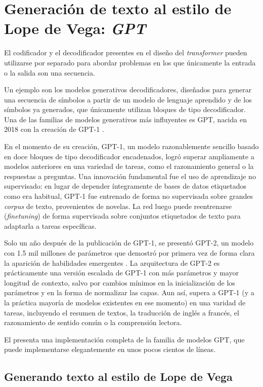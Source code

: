 \chapter{Generación de texto al estilo de Lope de Vega: \textit{GPT}}
El codificador y el decodificador presentes en el diseño del \textit{transformer} pueden utilizarse por separado para abordar problemas en los que únicamente la entrada o la salida son una secuencia. 

Un ejemplo son los modelos generativos decodificadores, diseñados para generar una secuencia de símbolos a partir de un modelo de lenguaje aprendido y de los símbolos ya generados, que únicamente utilizan bloques de tipo decodificador. Una de las familias de modelos generativos más influyentes es GPT, nacida en 2018 con la creación de GPT-1 \cite{radford2018improving}.

En el momento de su creación, GPT-1, un modelo razonablemente sencillo basado en doce bloques de tipo decodificador encadenados, logró superar ampliamente a modelos anteriores en una variedad de tareas, como el razonamiento general o la respuestas a preguntas. Una innovación fundamental fue el uso de aprendizaje no supervisado: en lugar de depender íntegramente de bases de datos etiquetados como era habitual, GPT-1 fue entrenado de forma no supervisada sobre grandes \textit{corpus} de texto, provenientes de novelas. La red luego puede reentrenarse (\textit{finetuning}) de forma supervisada sobre conjuntos etiquetados de texto para adaptarla a tareas específicas.

Solo un año después de la publicación de GPT-1, se presentó GPT-2, un modelo con 1.5 mil millones de parámetros que demostró por primera vez de forma clara la aparición de habilidades emergentes \cite{radford2019language}. La arquitectura de GPT-2 es prácticamente una versión escalada de GPT-1 con más parámetros y mayor longitud de contexto, salvo por cambios mínimos en la inicialización de los parámetros y en la forma de normalizar las capas. Aun así, supera a GPT-1 (y a la práctica mayoría de modelos existentes en ese momento) en una varidad de tareas, incluyendo el resumen de textos, la traducción de inglés a francés, el razonamiento de sentido común o la comprensión lectora.

El  presenta una implementación completa de la familia de modelos GPT, que puede implementarse elegantemente en unos pocos cientos de líneas.

\section{Generando texto al estilo de Lope de Vega}

